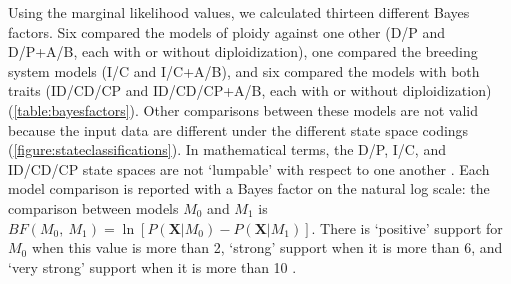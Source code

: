 Using the marginal likelihood values, we calculated thirteen different Bayes factors.
Six compared the models of ploidy against one other (D/P and D/P+A/B, each with or without diploidization), one compared the breeding system models (I/C and I/C+A/B), and six compared the models with both traits (ID/CD/CP and ID/CD/CP+A/B, each with or without diploidization) (\cref{table:bayesfactors}).
%
Other comparisons between these models are not valid because the input data are different under the different state space codings (\cref{figure:stateclassifications}).
In mathematical terms, the D/P, I/C, and ID/CD/CP state spaces are not `lumpable' with respect to one another \citep{tarasov_2019}.
Each model comparison is reported with a Bayes factor on the natural log scale: the comparison between models $M_0$ and $M_1$ is $BF(M_0,\ M_1) = \ln[ P(\mathbf{X} | M_0) - P(\mathbf{X} | M_1)]$.
There is `positive' support for $M_0$ when this value is more than 2, `strong' support when it is more than 6, and `very strong' support when it is more than 10 \citep{kass1995}.

